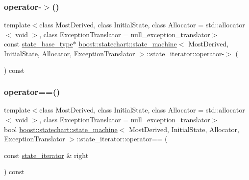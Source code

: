 \subsubsection{\texorpdfstring{operator-\/$>$()}{operator->()}}
{\footnotesize\ttfamily template$<$class Most\+Derived, class Initial\+State, class Allocator = std\+::allocator$<$ void $>$, class Exception\+Translator = null\+\_\+exception\+\_\+translator$>$ \\
const \mbox{\hyperlink{classboost_1_1statechart_1_1state__machine_a69cc258c29fcabec25c5dc8bedb7d530}{state\+\_\+base\+\_\+type}}$\ast$ \mbox{\hyperlink{classboost_1_1statechart_1_1state__machine}{boost\+::statechart\+::state\+\_\+machine}}$<$ Most\+Derived, Initial\+State, Allocator, Exception\+Translator $>$\+::state\+\_\+iterator\+::operator-\/$>$ (\begin{DoxyParamCaption}{ }\end{DoxyParamCaption}) const\hspace{0.3cm}{\ttfamily [inline]}}

\mbox{\label{classboost_1_1statechart_1_1state__machine_1_1state__iterator_a63c4c48e6f7e52637c5e6630005c7326}} 
\subsubsection{\texorpdfstring{operator==()}{operator==()}}
{\footnotesize\ttfamily template$<$class Most\+Derived, class Initial\+State, class Allocator = std\+::allocator$<$ void $>$, class Exception\+Translator = null\+\_\+exception\+\_\+translator$>$ \\
bool \mbox{\hyperlink{classboost_1_1statechart_1_1state__machine}{boost\+::statechart\+::state\+\_\+machine}}$<$ Most\+Derived, Initial\+State, Allocator, Exception\+Translator $>$\+::state\+\_\+iterator\+::operator== (\begin{DoxyParamCaption}\item[{const \mbox{\hyperlink{classboost_1_1statechart_1_1state__machine_1_1state__iterator}{state\+\_\+iterator}} \&}]{right }\end{DoxyParamCaption}) const\hspace{0.3cm}{\ttfamily [inline]}}



